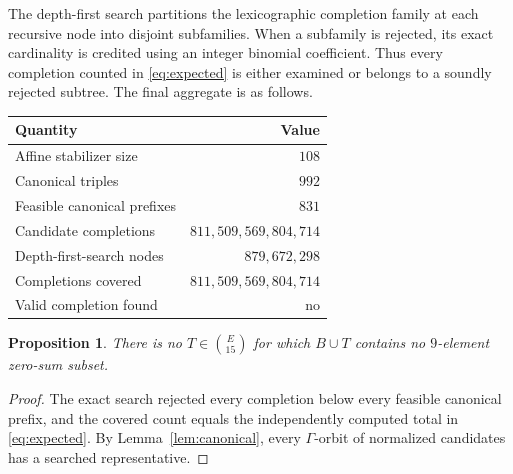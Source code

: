 \documentclass[11pt]{amsart}
\newtheorem{proposition}[theorem]{Proposition}
\begin{document}
The depth-first search partitions the lexicographic completion family at
each recursive node into disjoint subfamilies. When a subfamily is
rejected, its exact cardinality is credited using an integer binomial
coefficient. Thus every completion counted in \eqref{eq:expected} is
either examined or belongs to a soundly rejected subtree. The final
aggregate is as follows.

\begin{center}
\small
\begin{tabular}{@{}lr@{}}
\toprule
Quantity & Value \\
\midrule
Affine stabilizer size
  & $108$ \\
Canonical triples
  & $992$ \\
Feasible canonical prefixes
  & $831$ \\
Candidate completions
  & $811{,}509{,}569{,}804{,}714$ \\
Depth-first-search nodes
  & $879{,}672{,}298$ \\
Completions covered
  & $811{,}509{,}569{,}804{,}714$ \\
Valid completion found
  & no \\
\bottomrule
\end{tabular}
\end{center}

\begin{proposition}\label{prop:search}
There is no $T\in\binom{E}{15}$ for which $B\cup T$ contains no
$9$-element zero-sum subset.
\end{proposition}

\begin{proof}
The exact search rejected every completion below every feasible canonical
prefix, and the covered count equals the independently computed total in
\eqref{eq:expected}. By Lemma~\ref{lem:canonical}, every $\Gamma$-orbit
of normalized candidates has a searched representative.
\end{proof}
\end{document}
